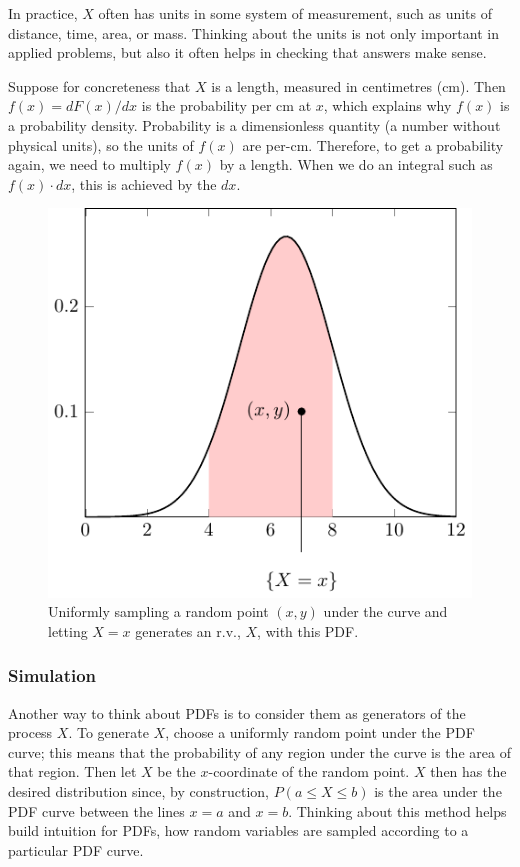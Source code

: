 In practice, 
\(X\) often has units in some system of measurement, 
such as units of distance, time, area, or mass. 
Thinking about the units is not only important in applied problems, 
but also it often helps in checking that answers make sense.

Suppose for concreteness that \(X\) is a length, 
measured in centimetres (cm). 
Then \(f(x) = dF(x)/dx\) is the probability per cm at \(x\), 
which explains why \(f(x)\) is a probability density. 
Probability is a dimensionless quantity (a number without physical units), 
so the units of \(f(x)\) are per-cm. 
Therefore, to get a probability again, 
we need to multiply \(f(x)\) by a length. 
When we do an integral such as \(f(x) \cdot dx\), 
this is achieved by the \(dx\).

\begin{figure}[h!]
\centering
\includegraphics[width=0.5\linewidth]{tikz/figure3}
\caption{%
Uniformly sampling a random point \((x,y)\) under the curve 
and letting \(X=x\) generates an r.v., \(X\), with this PDF.
}
\label{fig:generator}
\end{figure}

\subsubsection{Simulation} 

Another way to think about PDFs is to consider them as generators of the process \(X\). 
To generate \(X\), 
choose a uniformly random point under the PDF curve;
this means that the probability of any region under the curve is the area of that region. 
Then let \(X\) be the \(x\)-coordinate of the random point. 
\(X\) then has the desired distribution since, 
by construction, 
\(P(a \leq X \leq b)\) is the area under the PDF curve 
between the lines \(x = a\) and \(x = b\). 
Thinking about this method helps build intuition for PDFs, 
how random variables are sampled according to a particular PDF curve.

